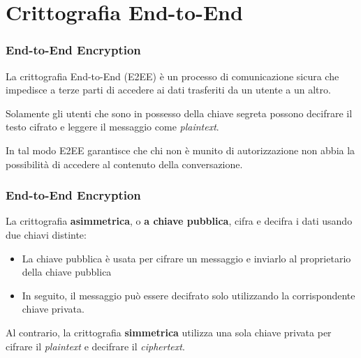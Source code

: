 \section{Crittografia End-to-End}
\begin{frame}
    \frametitle{End-to-End Encryption}
    La crittografia End-to-End (E2EE) è un processo di comunicazione sicura che impedisce a terze parti di accedere ai dati trasferiti da un utente a un altro.\newline
    
    Solamente gli utenti che sono in possesso della chiave segreta possono decifrare il testo cifrato e leggere il messaggio
    come \textit{plaintext}.\newline

    In tal modo E2EE garantisce che chi non è munito di autorizzazione non abbia la possibilità di accedere al contenuto della conversazione. 


\end{frame}

\begin{frame}
    \frametitle{End-to-End Encryption}
        La crittografia \textbf{asimmetrica}, o \textbf{a chiave pubblica}, cifra e decifra i dati usando due chiavi distinte:
    \begin{itemize}
        \item La chiave pubblica è usata per cifrare un messaggio e inviarlo al proprietario della chiave pubblica
        \item In seguito, il messaggio può essere decifrato solo utilizzando la corrispondente chiave privata.
    \end{itemize}

    Al contrario, la crittografia \textbf{simmetrica} utilizza una sola chiave privata per cifrare il \textit{plaintext} e decifrare il \textit{ciphertext}.

\end{frame}

